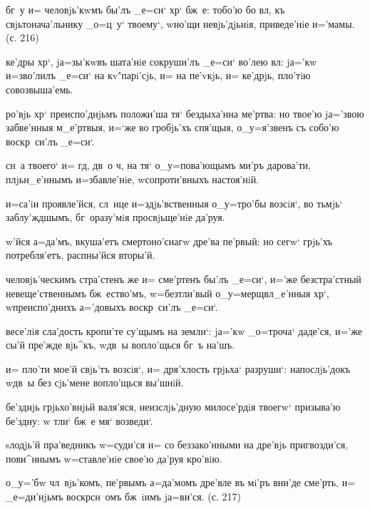   бг~у и= человjь'кwмъ бы'лъ 
_е=си` хр` бж~е: тобо'ю бо вл, къ 
свjьтонача'льнику _о=ц~у` твоему`, w\т но'щи 
невjь'дjьнiя, приведе'нiе и='мамы. (с. 216)

 ке'дры хр`, jа=зы'кwвъ шата'нiе 
сокруши'лъ _е=си` во'лею вл: jа='кw и=зво'лилъ _е=си` 
на кv"парi'сjь, и= на пе'vкjь, и= ке'дрjь, пло'тiю 
совозвыша'емь.

 ро'вjь хр` преиспо'днjьмъ положи'ша тя` 
бездыха'нна ме'ртва: но твое'ю jа='звою забве'нныя 
м_е'ртвыя, и=`же во гробjь'хъ спя'щыя, о_у=я'звенъ съ 
собо'ю воскр~си'лъ _е=си`.

  сн~а твоего` и= гд, дв~о 
ч, на тя` о_у=пова'ющымъ ми'ръ дарова'ти, 
плjьн_е'ннымъ и=збавле'нiе, w\т сопроти'вныхъ настоя'нiй.


  и=са'iи проявле'йся, сл~нце 
и=з\ъ дjь'вственныя о_у=тро'бы возсiя`, во тьмjь` 
заблу'ждшымъ, бг~оразу'мiя просвjьще'нiе да'руя.

 w'йся а=да'мъ, вкуша'етъ 
смертоно'снагw дре'ва пе'рвый: но сегw` грjь'хъ 
потребля'етъ, распны'йся вторы'й.

 человjь'ческимъ стра'стенъ же и= 
сме'ртенъ бы'лъ _е=си`, и='же безстра'стный 
невеще'ственнымъ бж~ество'мъ, w=безтли'вый 
о_у=мерщвл_е'нныя хр`, w\т преиспо'днихъ а='довыхъ 
воскр~си'лъ _е=си`.


 весе'лiя сла'дость кропи'те су'щымъ на 
земли`: jа='кw _о=троча` даде'ся, и='же сы'й пре'жде 
вjь^къ, w\т дв~ы вопло'щься бг~ъ на'шъ.

 и= пло'ти мое'й свjь'тъ возсiя`, и= 
дря'хлость грjьха` разруши`: напослjь'докъ w\т дв~ы без\ъ 
сjь'мене вопло'щься вы'шнiй.


  бе'зднjь грjьхо'внjьй валя'яся, 
неизслjь'дную милосе'рдiя твоегw` призыва'ю бе'здну: w\т 
тли` бж~е мя` возведи`.

 sлодjь'й пра'ведникъ w=суди'ся и= со 
беззако'нными на дре'вjь пригвозди'ся, пови^ннымъ 
w=ставле'нiе свое'ю да'руя кро'вiю.

 о_у='бw чл~вjь'комъ, пе'рвымъ 
а=да'момъ дре'вле въ мi'ръ вни'де сме'рть, и= _е=ди'нjьмъ 
воскр сн~омъ бж~iимъ jа=ви'ся. (с. 217)

